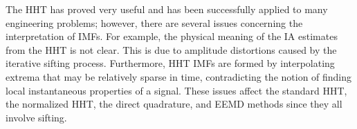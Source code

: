 \documentclass[a4paper]{IEEEtran}
\begin{document}

The HHT has proved very useful and has been successfully applied to many engineering problems; however, there are several issues concerning the interpretation of IMFs. For example, the physical meaning of the IA estimates from the HHT is not clear. This is due to amplitude distortions caused by the iterative sifting process. Furthermore, HHT IMFs are formed by interpolating extrema that may be relatively sparse in time, contradicting the notion of finding local instantaneous properties of a signal. These issues affect the standard HHT, the normalized HHT, the direct quadrature, and EEMD methods since they all involve sifting. 

% 
\end{document}

